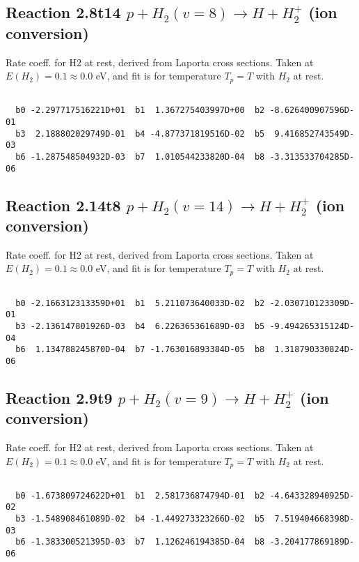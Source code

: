 \documentclass[12pt,dvipdfmx]{article}
\begin{document}
\newpage
\subsection{
Reaction 2.8t14
$ p + H_2(v=8) \rightarrow H + H_2^+$ (ion conversion)
}
Rate coeff. for H2 at rest, derived from Laporta cross sections.
Taken at $E(H_2) = 0.1 \approx 0.0$ eV,  and fit is for temperature $T_p=T$ with $H_2$ at rest.

\begin{small}\begin{verbatim}

  b0 -2.297717516221D+01  b1  1.367275403997D+00  b2 -8.626400907596D-01
  b3  2.188802029749D-01  b4 -4.877371819516D-02  b5  9.416852743549D-03
  b6 -1.287548504932D-03  b7  1.010544233820D-04  b8 -3.313533704285D-06

\end{verbatim}\end{small}

\newpage
\subsection{
Reaction 2.14t8
$ p + H_2(v=14) \rightarrow H + H_2^+$ (ion conversion)
}
Rate coeff. for H2 at rest, derived from Laporta cross sections.
Taken at $E(H_2) = 0.1 \approx 0.0$ eV,  and fit is for temperature $T_p=T$ with $H_2$ at rest.

\begin{small}\begin{verbatim}

  b0 -2.166312313359D+01  b1  5.211073640033D-02  b2 -2.030710123309D-01
  b3 -2.136147801926D-03  b4  6.226365361689D-03  b5 -9.494265315124D-04
  b6  1.134788245870D-04  b7 -1.763016893384D-05  b8  1.318790330824D-06

\end{verbatim}\end{small}

\newpage
\subsection{
Reaction 2.9t9
$ p + H_2(v=9) \rightarrow H + H_2^+$ (ion conversion)
}
Rate coeff. for H2 at rest, derived from Laporta cross sections.
Taken at $E(H_2) = 0.1 \approx 0.0$ eV,  and fit is for temperature $T_p=T$ with $H_2$ at rest.

\begin{small}\begin{verbatim}

  b0 -1.673809724622D+01  b1  2.581736874794D-01  b2 -4.643328940925D-02
  b3 -1.548908461089D-02  b4 -1.449273323266D-02  b5  7.519404668398D-03
  b6 -1.383300521395D-03  b7  1.126246194385D-04  b8 -3.204177869189D-06

\end{verbatim}\end{small}
\end{document}
